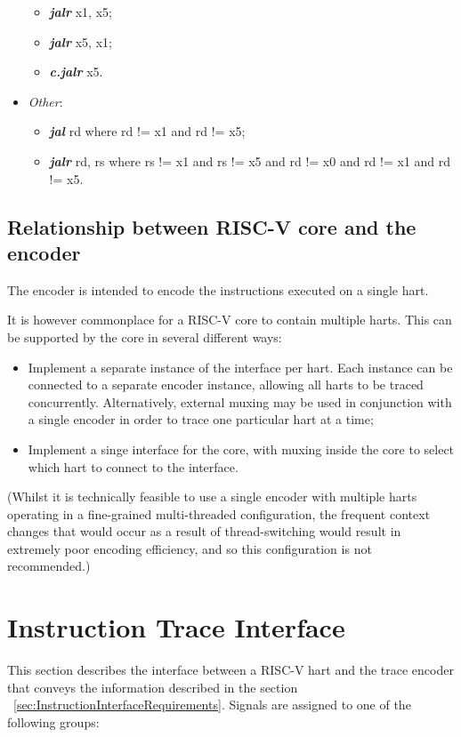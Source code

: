 \begin{itemize}
\begin{itemize}
      \item \textbf{\textit{jalr}} x1, x5;
      \item \textbf{\textit{jalr}} x5, x1;
      \item \textbf{\textit{c.jalr}} x5.
    \end{itemize}
  \item \textit{Other}: 
    \begin{itemize}
      \item \textbf{\textit{jal}} rd where rd != x1 and rd != x5;
      \item \textbf{\textit{jalr}} rd, rs where rs != x1 and rs != x5 and rd != x0 and rd != x1 and rd != x5.
    \end{itemize}
\end{itemize}

\subsection{Relationship between RISC-V core and the encoder} \label{sec:relationship}

The encoder is intended to encode the instructions executed on a single hart.  

It is however commonplace for a RISC-V core to contain multiple harts.  This can be 
supported by the core in several different ways:

\begin{itemize}
  \item Implement a separate instance of the interface per hart.  Each instance can be connected
    to a separate encoder instance, allowing all harts to be traced concurrently.  Alternatively,
    external muxing may be used in conjunction with a single encoder in order to trace one particular 
    hart at a time;
  \item Implement a singe interface for the core, with muxing inside the core to select which hart to 
  connect to the interface.
\end{itemize}

(Whilst it is technically feasible to use a single encoder with multiple harts operating 
in a fine-grained multi-threaded configuration, the frequent context changes that would occur
as a result of thread-switching would result in extremely poor encoding efficiency, and so
this configuration is not recommended.)

\section{Instruction Trace Interface}\label{sec:InstructionTraceInterface}
This section describes the interface between a RISC-V hart and the
trace encoder that conveys the information described in the section ~\ref{sec:InstructionInterfaceRequirements}.  
Signals are assigned to one of the  following groups:

